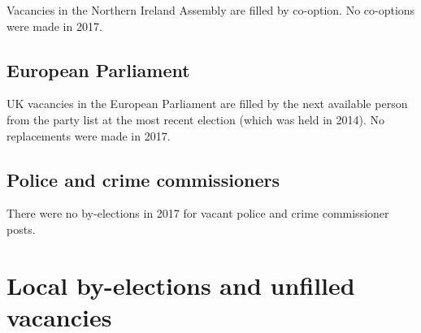 \documentclass[a4paper,openany]{book}
\begin{document}
Vacancies in the Northern Ireland Assembly are filled by co-option.
No co-options were made in 2017.
%

\section{European Parliament}

UK vacancies in the European Parliament are filled by the next available person from the party list at the most recent election (which was held in 2014). 
No replacements were made in 2017.

\section{Police and crime commissioners}

There were no by-elections in 2017 for vacant police and crime commissioner posts.

\chapter{Local by-elections and unfilled vacancies}
\end{document}
